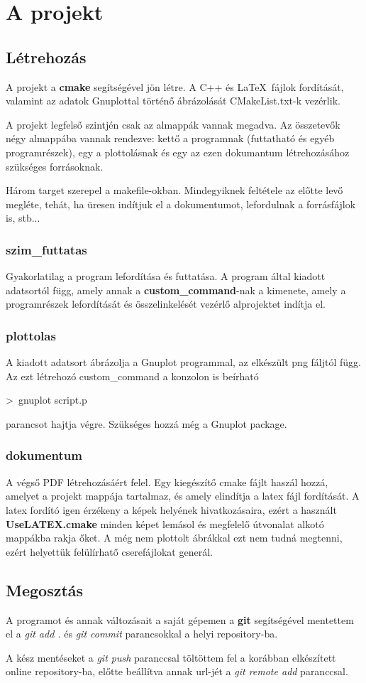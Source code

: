 \documentclass[twoside]{article}
\begin{document}
	\pagebreak
	\section*{A projekt}
	\subsection*{Létrehozás}
		A projekt a \textbf{cmake} segítségével jön létre. A C++ és \LaTeX\ fájlok fordítását, valamint az adatok Gnuplottal történő ábrázolását CMakeList.txt-k vezérlik.\par 
		A projekt legfelső szintjén csak az almappák vannak megadva. Az összetevők négy almappába vannak rendezve: kettő a programnak (futtatható és egyéb programrészek), egy a plottolásnak és egy az ezen dokumantum létrehozásához szükséges forrásoknak.\par 
		Három target szerepel a makefile-okban. Mindegyiknek feltétele az előtte levő megléte, tehát, ha üresen indítjuk el a dokumentumot, lefordulnak a forrásfájlok is, stb...\par 
		\subsubsection*{szim\_futtatas}
		Gyakorlatilag a program lefordítása és futtatása. A program által kiadott adatsortól függ, amely annak a \textbf{custom\_command}-nak a kimenete, amely a programrészek lefordítását és összelinkelését vezérlő alprojektet indítja el.\par 
		\subsubsection*{plottolas}
		A kiadott adatsort ábrázolja a Gnuplot programmal, az elkészült png fáljtól függ. Az ezt létrehozó custom\_command a konzolon is beírható \par
		{ \centering \textgreater\ gnuplot script.p \par }
		parancsot hajtja végre. Szükséges hozzá még a Gnuplot package.
		\subsubsection*{dokumentum}
		A végső PDF létrehozásáért felel. Egy kiegészítő cmake fájlt haszál hozzá, amelyet a projekt mappája tartalmaz, és amely elindítja a latex fájl fordítását. A latex fordító igen érzékeny a képek helyének hivatkozásaira, ezért a használt \textbf{UseLATEX.cmake} minden képet lemásol és megfelelő útvonalat alkotó mappákba rakja őket. A még nem plottolt ábrákkal ezt nem tudná megtenni, ezért helyettük felülírhatő cserefájlokat generál.\par 
	\subsection*{Megosztás}
		A programot és annak változásait a saját gépemen a \textbf{git} segítségével mentettem el a \textit{git add .} és \textit{git commit} parancsokkal a helyi repository-ba. \par
		A kész mentéseket a \textit{git push} paranccsal töltöttem fel a korábban elkészített online repository-ba, előtte beállítva annak url-jét a \textit{git remote add} paranccsal.
\end{document}

